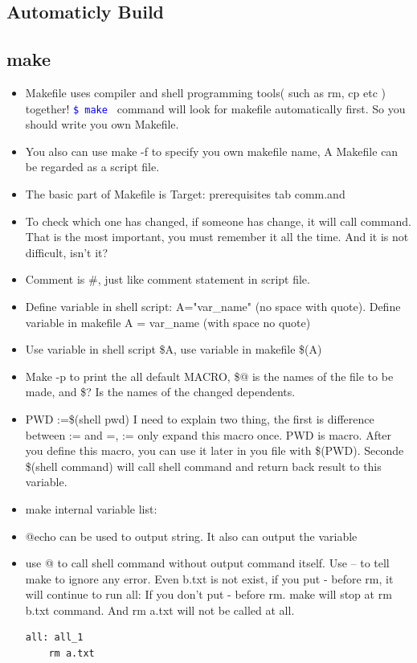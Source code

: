 \documentclass[a4paper,12pt,twoside]{book}
\newcommand{\linuxcommand}[1]{\texttt{\textcolor{blue}{\$ #1 \Pisymbol{psy}{191}}}}
\begin{document}
\begin{itemize}
\section{Automaticly Build}
\subsection{make}

	\begin{itemize}
		\item Makefile uses compiler and shell programming tools( such as rm, cp etc ) together! \linuxcommand{make} command will look for makefile automatically first. So you should write you own Makefile.
		\item You also can use make -f to specify you own makefile name, A Makefile can be regarded as a script file.

		\item The basic part of Makefile is Target: prerequisites
                        tab comm.and
		\item To check which one has changed, if someone has change, it will call command. That is the most important, you must remember it all the time.  And it is not difficult, isn't it?

		\item Comment is \#, just like comment statement in script file.
		
		\item Define variable in shell script: A="var\_name" (no space with quote). Define variable in makefile A = var\_name (with space no quote)
		\item Use variable in shell script \$A, use variable in makefile \$(A)
		
		
		\item Make -p to print the all default MACRO, \$@ is the names of the file to be made, and \$? Is the names of
the changed dependents.

		\item PWD :=\$(shell pwd) I need to explain two thing, the first is difference between := and =, := only
expand this macro once.    PWD is macro. After you define this macro, you can use it later in you file with
\$(PWD). Seconde \$(shell command) will call shell command and return back result to this variable. 

\item make internal variable list:


		\item @echo can be used to output string. It also can output the variable
		\item use @ to call shell command without output command itself. Use – to tell make to ignore any error. Even b.txt is not exist, if you put - before rm, it will continue to run all: If you don't put - before rm. make will stop at rm b.txt command. And rm a.txt will not be called at all.  
\begin{verbatim}
all: all_1
	rm a.txt
	 

\end{verbatim}
\end{itemize}
\end{itemize}
\end{document}
